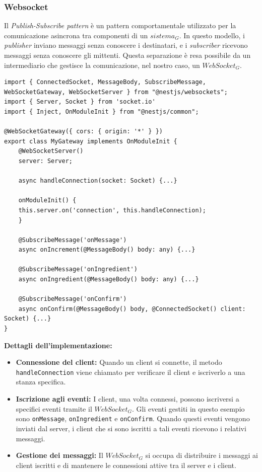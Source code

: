 \subsubsection{Websocket}
Il \textit{Publish-Subscribe pattern} è un pattern comportamentale utilizzato per la comunicazione asincrona tra componenti di un $\textit{sistema}_G$. In questo modello, i \textit{publisher} inviano messaggi senza conoscere i destinatari, e i \textit{subscriber} ricevono messaggi senza conoscere gli mittenti. Questa separazione è resa possibile da un intermediario che gestisce la comunicazione, nel nostro caso, un $\textit{WebSocket}_G$.
\begin{lstlisting}[style=ES6, caption={Esempio di come viene definita la classe MyGateway per implementare il socket}]
import { ConnectedSocket, MessageBody, SubscribeMessage, WebSocketGateway, WebSocketServer } from "@nestjs/websockets";
import { Server, Socket } from 'socket.io'
import { Inject, OnModuleInit } from "@nestjs/common";

@WebSocketGateway({ cors: { origin: '*' } })
export class MyGateway implements OnModuleInit {
    @WebSocketServer()
    server: Server;

    async handleConnection(socket: Socket) {...}

    onModuleInit() {
    this.server.on('connection', this.handleConnection);
    }

    @SubscribeMessage('onMessage')
    async onIncrement(@MessageBody() body: any) {...}

    @SubscribeMessage('onIngredient')
    async onIngredient(@MessageBody() body: any) {...}

    @SubscribeMessage('onConfirm')
    async onConfirm(@MessageBody() body, @ConnectedSocket() client: Socket) {...}
}
\end{lstlisting}
\textbf{Dettagli dell'implementazione:}
\begin{itemize}
\item \textbf{Connessione del client:} Quando un client si connette, il metodo \texttt{handleConnection} viene chiamato per verificare il client e iscriverlo a una stanza specifica.
\item \textbf{Iscrizione agli eventi:} I client, una volta connessi, possono iscriversi a specifici eventi tramite il $\textit{WebSocket}_G$. Gli eventi gestiti in questo esempio sono \texttt{onMessage}, \texttt{onIngredient} e \texttt{onConfirm}. Quando questi eventi vengono inviati dal server, i client che si sono iscritti a tali eventi ricevono i relativi messaggi.
\item \textbf{Gestione dei messaggi:} Il $\textit{WebSocket}_G$ si occupa di distribuire i messaggi ai client iscritti e di mantenere le connessioni attive tra il server e i client.
\end{itemize}

